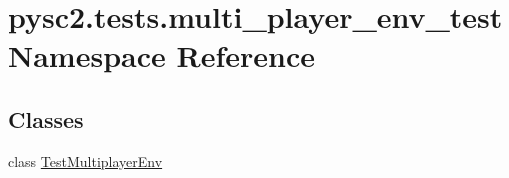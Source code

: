 \hypertarget{namespacepysc2_1_1tests_1_1multi__player__env__test}{}\section{pysc2.\+tests.\+multi\+\_\+player\+\_\+env\+\_\+test Namespace Reference}
\label{namespacepysc2_1_1tests_1_1multi__player__env__test}
\subsection*{Classes}
\begin{DoxyCompactItemize}
\item 
class \mbox{\hyperlink{classpysc2_1_1tests_1_1multi__player__env__test_1_1_test_multiplayer_env}{Test\+Multiplayer\+Env}}
\end{DoxyCompactItemize}
